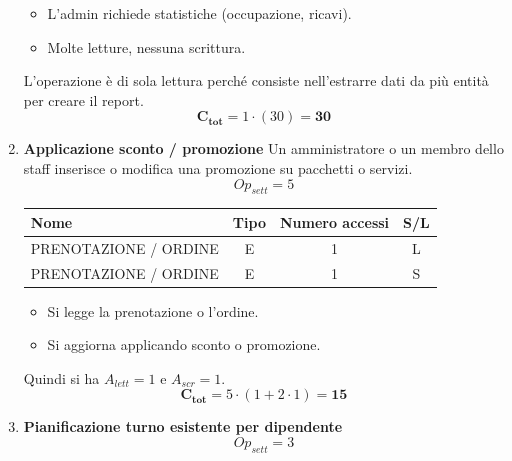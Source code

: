 \documentclass[a4paper,12pt]{report}
\begin{document}
\begin{enumerate}
	      \begin{itemize}
		      \item L'admin richiede statistiche (occupazione, ricavi).
		      \item Molte letture, nessuna scrittura.
	      \end{itemize}

	      L'operazione è di sola lettura perché consiste nell'estrarre dati da più entità per creare il report.
	      $$\mathbf{C_{tot}} = 1 \cdot (30) = \mathbf{30}$$


	\item {\large \textbf{Applicazione sconto / promozione}} \label{op8}
	      Un amministratore o un membro dello staff inserisce o modifica una promozione su pacchetti o servizi.
	      $$
		      Op_{sett} = 5
	      $$

	      \begin{table}[H]
		      \centering
		      \small
		      \renewcommand{\arraystretch}{1.15}
		      \begin{tabularx}{0.8\textwidth}{|X|c|c|c|}
			      \hline
			      \rowcolor{gray!20}
			      \textbf{Nome}         & \textbf{Tipo} & \textbf{Numero accessi} & \textbf{S/L} \\
			      \hline
			      PRENOTAZIONE / ORDINE & E             & 1                       & L            \\
			      PRENOTAZIONE / ORDINE & E             & 1                       & S            \\
			      \hline
		      \end{tabularx}
	      \end{table}

	      \begin{itemize}
		      \item Si legge la prenotazione o l'ordine.
		      \item Si aggiorna applicando sconto o promozione.
	      \end{itemize}

	      Quindi si ha $A_{lett}=1$ e $A_{scr}=1$.
	      $$\mathbf{C_{tot}} = 5 \cdot (1 + 2 \cdot 1) = \mathbf{15}$$

	\item {\large \textbf{Pianificazione turno esistente per dipendente}} \label{op9}
	      $$
		      Op_{sett} = 3
	      $$


\end{enumerate}
\end{document}
